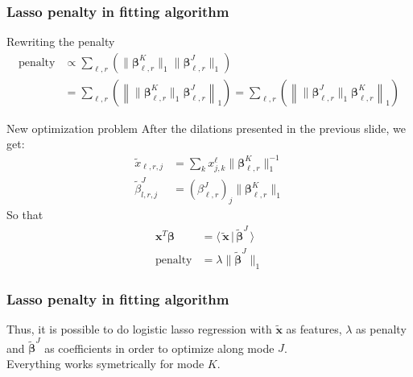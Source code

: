 \documentclass{beamer}
\begin{document}
\begin{frame}
    \frametitle{Lasso penalty in fitting algorithm}
    \begin{block}{Rewriting the penalty}
    \begin{align}
        \text{penalty} &\propto \sum\limits_{\ell,r} \left( \lVert \bm{\beta}_{\ell,r}^K \rVert_1 \lVert \bm{\beta}_{\ell,r}^J \rVert_1 \right)\\
        &= \sum\limits_{\ell,r} \left( \left\lVert  \lVert\bm{\beta}_{\ell,r}^K \rVert_1  \bm{\beta}_{\ell,r}^J \right\rVert_1 \right)  = \sum\limits_{\ell,r} \left( \left\lVert  \lVert\bm{\beta}_{\ell,r}^J \rVert_1  \bm{\beta}_{\ell,r}^K \right\rVert_1  \right)
    \end{align}
\end{block}
\end{frame}

\begin{frame}
    \begin{block}{New optimization problem}
        After the dilations presented in the previous slide, we get:
        \begin{align}
        \tilde{x}_{\ell,r,j} &= \sum\limits_{k}x_{j,k}^\ell\lVert \bm{\beta}_{\ell,r}^K\rVert_1^{-1}\\
        \tilde{\beta}_{l,r,j}^J &= 
        (\beta_{\ell,r}^J)_j\lVert \bm{\beta}_{\ell,r}^K \rVert_1 
        \end{align}
        \phantom{a}\hspace{40 pt}So that\\[-20 pt]
        \begin{align}
        \mathbf{x}^T\bm{\beta} &=  \langle \tilde{\,\mathbf{x}}\,|\, \tilde{\bm{\beta}}^J \,\rangle \\
        \text{penalty} &= \lambda \lVert \tilde{\bm{\beta}}^J\rVert_1
        \end{align}
    \end{block}
    \frametitle{Lasso penalty in fitting algorithm}
    \noindent Thus, it is possible to do logistic lasso regression with $\tilde{\mathbf{x}}$ as features, $\lambda$ as penalty and $\tilde{\bm{\beta}}^J$ as coefficients in order to optimize along mode $J$.\\[5 pt]
    Everything works symetrically for mode $K$.
\end{frame}
\end{document}
